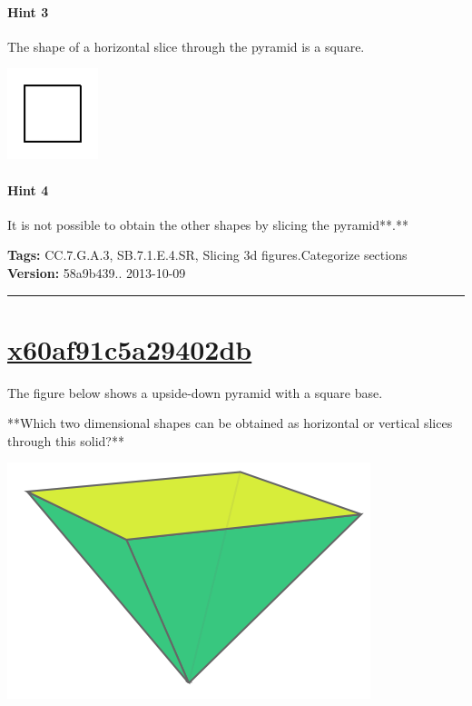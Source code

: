 \documentclass[twocolumn,10pt]{article}
\def\shrinkfactor{0.4}
\begin{document}
\paragraph{Hint 3}The shape of a horizontal slice through the pyramid is a square.  

\includegraphics[scale=\shrinkfactor]{figures/4b59a0ece6acc7c19c389e1de534d1df93bf1169.png}

\paragraph{Hint 4}It is not possible to obtain the other shapes by slicing the pyramid**.**



\medskip
\noindent
\textbf{Tags:} {\footnotesize CC.7.G.A.3, SB.7.1.E.4.SR, Slicing 3d figures.Categorize sections}\\
\textbf{Version:} 58a9b439.. 2013-10-09
\smallskip\hrule





\section{\href{https://www.khanacademy.org/devadmin/content/items/x60af91c5a29402db}{x60af91c5a29402db}}

\noindent
The figure below shows a upside-down pyramid with a square base. 

**Which two dimensional shapes can be obtained as  horizontal or vertical slices through this solid?**  


\includegraphics[scale=\shrinkfactor]{figures/45af389acb5f166ac18e94dbcfed4f1b2e621634.png}
\end{document}
